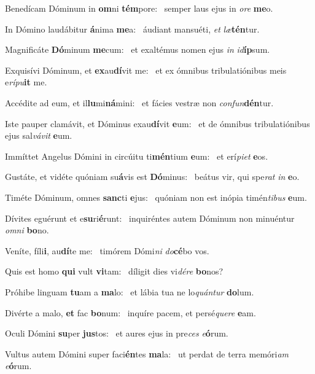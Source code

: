 \item Benedícam Dóminum in \textbf{om}ni \textbf{tém}pore:~\psstar{} semper laus ejus in \textit{ore} \textbf{me}o.
\item In Dómino laudábitur \textbf{á}nima \textbf{me}a:~\psstar{} áudiant mansuéti, \textit{et} \textit{læ}\textbf{tén}tur.
\item Magnificáte \textbf{Dó}minum \textbf{me}\-cum:~\psstar{} et exaltémus nomen ejus \textit{in} \textit{id}\textbf{íp}sum.
\item Exquisívi Dóminum, et \textbf{ex}au\textbf{dí}vit me:~\psstar{} et ex ómnibus tribulatiónibus meis e\textit{rípu}\textbf{it} me.
\item Accédite ad eum, et il\textbf{lu}mi\textbf{ná}mini:~\psstar{} et fácies vestræ non \textit{confun}\textbf{dén}tur.
\item Iste pauper clamávit, et Dóminus exau\textbf{dí}vit \textbf{e}um:~\psstar{} et de ómnibus tribulatiónibus ejus sal\textit{vávit} \textbf{e}um.
\item Immíttet Angelus Dómini in circúitu ti\textbf{mén}tium \textbf{e}um:~\psstar{} et erí\textit{piet} \textbf{e}os.
\item Gustáte, et vidéte quóniam su\textbf{á}vis est \textbf{Dó}minus:~\psstar{} beátus vir, qui spe\textit{rat} \textit{in} \textbf{e}o.
\item Timéte Dóminum, omnes \textbf{sanc}ti \textbf{e}jus:~\psstar{} quóniam non est inópia timén\textit{tibus} \textbf{e}um.
\item Dívites eguérunt et e\textbf{su}ri\textbf{é}\-runt:~\psstar{} inquiréntes autem Dóminum non minuéntur \textit{omni} \textbf{bo}no.
\item Veníte, fíli\textbf{i}, au\textbf{dí}te me:~\psstar{} timórem Dómi\textit{ni} \textit{do}\textbf{cé}bo vos.
\item Quis est homo \textbf{qui} vult \textbf{vi}tam:~\psstar{} díligit dies vi\textit{dére} \textbf{bo}nos?
\item Próhibe linguam \textbf{tu}am a \textbf{ma}lo:~\psstar{} et lábia tua ne lo\textit{quántur} \textbf{do}lum.
\item Divérte a malo, \textbf{et} fac \textbf{bo}num:~\psstar{} inquíre pacem, et persé\textit{quere} \textbf{e}am.
\item Oculi Dómini \textbf{su}per \textbf{jus}tos:~\psstar{} et aures ejus in pre\textit{ces} \textit{e}\textbf{ó}rum.
\item Vultus autem Dómini super faci\textbf{én}tes \textbf{ma}la:~\psstar{} ut perdat de terra memóri\textit{am} \textit{e}\textbf{ó}rum.
